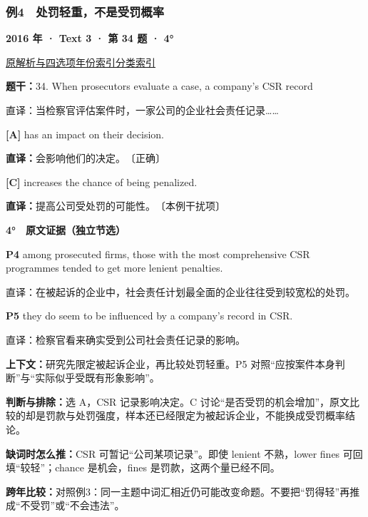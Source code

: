 \documentclass[11pt,a4paper]{article}
\begin{document}
\subsubsection{例4　处罚轻重，不是受罚概率}\label{case-2016-T3-Q34}
\noindent\textbf{2016 年 · Text 3 · 第 34 题 · 4°}\par\noindent \href{https://zj139.github.io/math-notes/english/b6f08ab4d489c8194307c00d/\#q34}{原解析与四选项}\quad \hyperref[idx-2016-T3-Q34]{年份索引}\quad \hyperref[class-R02]{分类索引}\par\smallskip
\noindent\textbf{题干：}34. When prosecutors evaluate a case, a company's CSR record\par
直译：当检察官评估案件时，一家公司的企业社会责任记录……\par
{}\noindent\textbf{[A]} has an impact on their decision.\par\nopagebreak
\noindent\textbf{直译：}会影响他们的决定。　〔正确〕\par
{}\noindent\textbf{[C]} increases the chance of being penalized.\par\nopagebreak
\noindent\textbf{直译：}提高公司受处罚的可能性。　〔本例干扰项〕\par
\begin{evidence}\textbf{4°　原文证据（独立节选）}\par
\textbf{P4} among prosecuted firms, those with the most comprehensive CSR programmes tended to get more lenient penalties.\par 直译：在被起诉的企业中，社会责任计划最全面的企业往往受到较宽松的处罚。\par
\textbf{P5} they do seem to be influenced by a company's record in CSR.\par 直译：检察官看来确实受到公司社会责任记录的影响。\par
\end{evidence}
\noindent\textbf{上下文：}研究先限定被起诉企业，再比较处罚轻重。P5 对照“应按案件本身判断”与“实际似乎受既有形象影响”。\par
\noindent\textbf{判断与排除：}选 A，CSR 记录影响决定。C 讨论“是否受罚的机会增加”，原文比较的却是罚款与处罚强度，样本还已经限定为被起诉企业，不能换成受罚概率结论。\par
\noindent\textbf{缺词时怎么推：}CSR 可暂记“公司某项记录”。即使 lenient 不熟，lower fines 可回填“较轻”；chance 是机会，fines 是罚款，这两个量已经不同。\par
\noindent\textbf{跨年比较：}对照例3：同一主题中词汇相近仍可能改变命题。不要把“罚得轻”再推成“不受罚”或“不会违法”。\par
\clearpage
\end{document}
